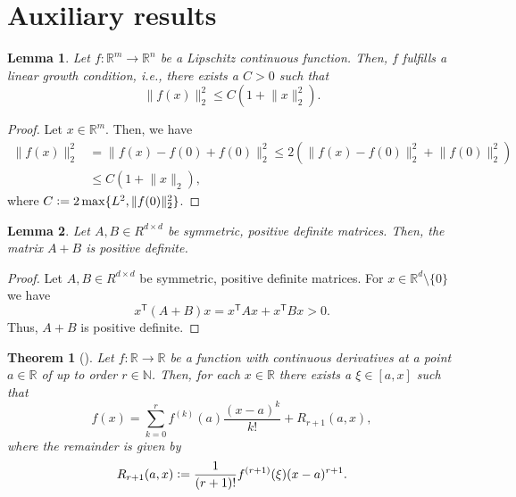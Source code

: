 \documentclass[12pt]{article}
\newtheorem{theorem}{Theorem}[section]
\newtheorem{lemma}[lemma]{Lemma}
\theoremstyle{definition}
\numberwithin{equation}{section}
\newcommand{\N}{\mathbb{N}}
\newcommand{\R}{\mathbb{R}}
\newcommand{\T}{\mathsf{T}}
\newcommand{\norm}[1]{\lVert{#1}\rVert_2}
\newcommand{\defeq}{\vcentcolon=}
\begin{document}
\section{Auxiliary results}
\begin{lemma}
  \label{lemma:linear_growth}
  Let $f : \R^m \rightarrow \R^n$ be a Lipschitz continuous function. Then, $f$ fulfills a linear growth condition, i.e., there exists a $C > 0$ such that 
  \begin{equation*}
    \norm{f(x)}^2 \leq C (1 + \norm{x}^2).
  \end{equation*}
\end{lemma}
\begin{proof}
  Let $x \in \R^m$. Then, we have
  \begin{align*}
    \norm{f(x)}^2 &= \norm{f(x) - f(0) + f(0)}^2 \leq 2 \left( \norm{f(x) - f(0)}^2 + \norm{f(0)}^2\right) \\
    &\leq C(1+\norm{x}),
  \end{align*}
  where $C \defeq 2\max\{L^2, \norm{f(0)}^2\}$.
\end{proof}
\begin{lemma}
  \label{lem:sum_positive_definite}
  Let $A,B \in R^{d \times d}$ be symmetric, positive definite matrices. Then, the matrix $A+B$ is positive definite.
\end{lemma}
\begin{proof}
  Let $A,B \in R^{d \times d}$ be symmetric, positive definite matrices. For $x \in \R^d \setminus \{0\}$ we have
  \begin{equation*}
    x^\T(A+B)x = x^\T A x + x^\T B x > 0.
  \end{equation*}
  Thus, $A+B$ is positive definite.
\end{proof}
\begin{theorem}[]
  \label{thm:taylor}
  Let $f : \R \rightarrow \R$ be a function with continuous derivatives at a point $a \in \R$ of up to order $r \in \N$. Then, for each $x \in \R$ there exists a $\xi \in [a,x]$ such that 
  \begin{equation*}
    f(x) = \sum_{k=0}^r f^{(k)}(a) \frac{(x-a)^k}{k!} + R_{r+1}(a,x),
  \end{equation*}
  where the \emph{remainder} is given by
  \begin{equation*}
    R_{r+1}(a,x) \defeq \frac{1}{(r+1)!}f^{(r+1)}(\xi)(x-a)^{r+1}.
  \end{equation*}
\end{theorem}
\end{document}
